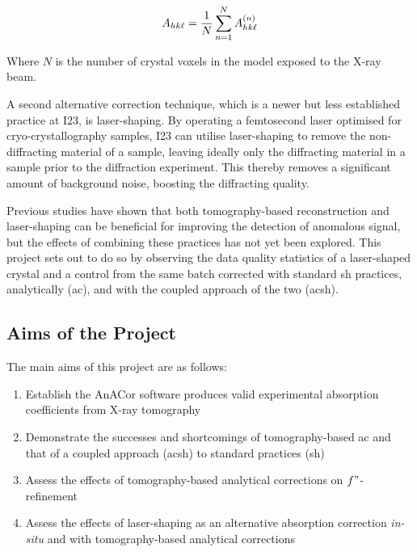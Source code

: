 \begin{equation}
    A_{hk\ell} = \frac{1}{N} \sum_{n=1}^N A_{hk\ell}^{(n)}
\end{equation}

Where $N$ is the number of crystal voxels in the model exposed to the X-ray beam.

A second alternative correction technique, which is a newer but less established practice at I23, is laser-shaping. By operating a femtosecond laser optimised for cryo-crystallography samples, I23 can utilise laser-shaping to remove the non-diffracting material of a sample, leaving ideally only the diffracting material in a sample prior to the diffraction experiment. This thereby removes a significant amount of background noise, boosting the diffracting quality.

Previous studies have shown that both tomography-based reconstruction and laser-shaping can be beneficial for improving the detection of anomalous signal, but the effects of combining these practices has not yet been explored. This project sets out to do so by observing the data quality statistics of a laser-shaped crystal and a control from the same batch corrected with standard \ac{sh} practices, analytically (\ac{ac}), and with the coupled approach of the two (\ac{acsh}).

\subsection{Aims of the Project} %

The main aims of this project are as follows:

\begin{enumerate}
    \item Establish the AnACor software produces valid experimental absorption coefficients from X-ray tomography
    \item Demonstrate the successes and shortcomings of tomography-based \ac{ac} and that of a coupled approach (\ac{acsh}) to standard practices (\ac{sh})
    \item Assess the effects of tomography-based analytical corrections on $f"$-refinement
    \item Assess the effects of laser-shaping as an alternative absorption correction \textit{in-situ} and with tomography-based analytical corrections
\end{enumerate}